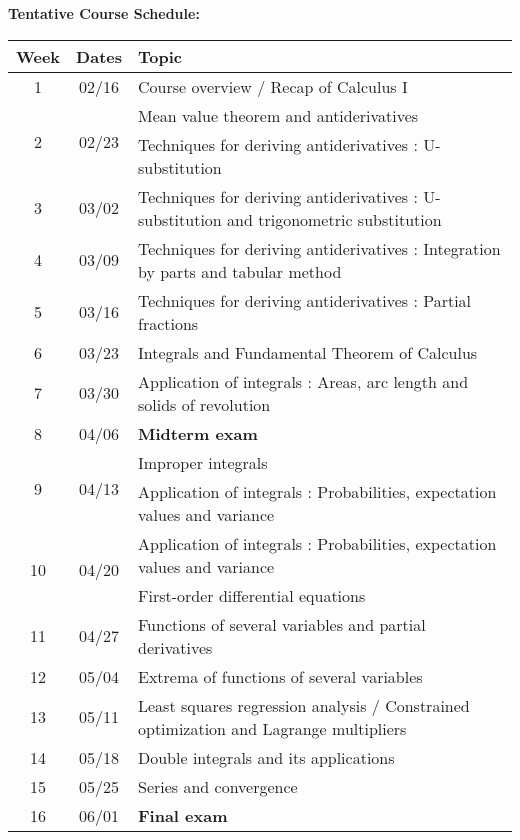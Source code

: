 \documentclass[11pt, a4paper]{article}
\begin{document}
\pagebreak
\vspace*{.15in}
\noindent \textbf{Tentative Course Schedule:}
\renewcommand{\arraystretch}{1}%
\begin{center}
   \begin{tabular}{ccl}
        \toprule
        Week & Dates & Topic \\
        \hline
        1 & 02/16 & Course overview / Recap of Calculus I \\
        \multirow{2}{*}{2} & \multirow{2}{*}{02/23} & Mean value theorem and antiderivatives \\
        && Techniques for deriving
antiderivatives : U-substitution \\
        3 & 03/02 & Techniques for deriving
antiderivatives : U-substitution and trigonometric substitution\\
        4 & 03/09 & Techniques for deriving antiderivatives : Integration by parts and tabular method\\
        5 & 03/16 & Techniques for deriving antiderivatives : Partial fractions \\
        6 & 03/23 & Integrals and Fundamental Theorem of Calculus\\
        7 & 03/30 & Application of integrals : Areas, arc length and solids of
revolution\\
        8 & 04/06 & \textbf{Midterm exam} \\
        \multirow{2}{*}{9} & \multirow{2}{*}{04/13} & Improper integrals \\
        && Application of integrals : Probabilities, expectation values and variance\\
        \multirow{2}{*}{10} & \multirow{2}{*}{04/20} & Application of integrals : Probabilities, expectation values and
variance \\
        && First-order differential equations\\
        11 & 04/27 & Functions of several variables and partial derivatives \\
        12 & 05/04 & Extrema of functions of several variables \\
        13 & 05/11 & Least squares regression analysis / Constrained optimization and
Lagrange multipliers \\
        14 & 05/18 & Double integrals and its applications\\
        15 & 05/25 & Series and convergence \\
        16 & 06/01 & \textbf{Final exam}  \\
        \bottomrule
    \end{tabular} 
\end{center}
\end{document}

